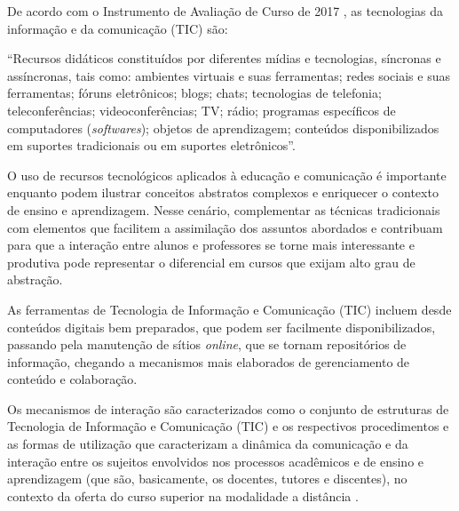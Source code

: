 
De acordo com o Instrumento de Avaliação de Curso de 2017 \cite{instrumento2017}, as tecnologias da informação e da comunicação (TIC) são: 

\begin{citacao}
    ``Recursos didáticos constituídos por diferentes mídias e tecnologias, síncronas e assíncronas, tais como: ambientes virtuais e suas ferramentas; redes sociais e suas ferramentas; fóruns eletrônicos; blogs; chats; tecnologias de telefonia; teleconferências; videoconferências; TV; rádio; programas específicos de computadores (\textit{softwares}); objetos de aprendizagem;   conteúdos disponibilizados em suportes tradicionais ou em suportes eletrônicos''.
\end{citacao}

O uso de recursos tecnológicos aplicados à educação e comunicação é importante enquanto podem ilustrar conceitos abstratos complexos e enriquecer o contexto de ensino e aprendizagem. Nesse cenário, complementar as técnicas tradicionais com elementos que facilitem a assimilação dos assuntos abordados e contribuam para que a interação entre alunos e professores se torne mais interessante e produtiva pode representar o diferencial em cursos que exijam alto grau de abstração.

As ferramentas de Tecnologia de Informação e Comunicação (TIC) incluem desde conteúdos digitais bem preparados, que podem ser facilmente disponibilizados, passando pela manutenção de sítios \textit{online}, que se tornam repositórios de informação, chegando a mecanismos mais elaborados de gerenciamento de conteúdo e colaboração.

Os mecanismos de interação são caracterizados como o conjunto de estruturas de Tecnologia de Informação e Comunicação (TIC) e os respectivos procedimentos e as formas de utilização que caracterizam a dinâmica da comunicação e da interação entre os sujeitos envolvidos nos processos acadêmicos e de ensino e aprendizagem (que são, basicamente, os docentes, tutores e discentes), no contexto da oferta do curso superior na modalidade a distância \cite{instrumento2017}.

